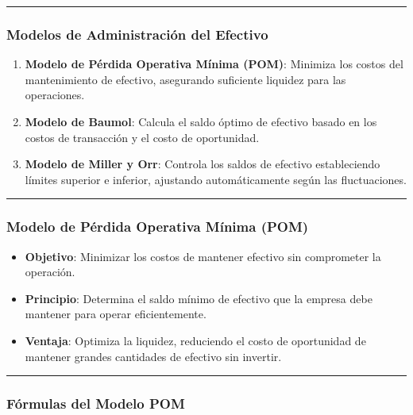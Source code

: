 \documentclass[
  letterpaper,
  DIV=11,
  numbers=noendperiod]{scrartcl}
\providecommand{\tightlist}{%
  \setlength{\itemsep}{0pt}\setlength{\parskip}{0pt}}\usepackage{longtable,booktabs,array}
\begin{document}
\begin{center}\rule{0.5\linewidth}{0.5pt}\end{center}

\subsubsection{Modelos de Administración del
Efectivo}\label{modelos-de-administraciuxf3n-del-efectivo}

\begin{enumerate}
\def\labelenumi{\arabic{enumi}.}
\tightlist
\item
  \textbf{Modelo de Pérdida Operativa Mínima (POM)}: Minimiza los costos
  del mantenimiento de efectivo, asegurando suficiente liquidez para las
  operaciones.
\item
  \textbf{Modelo de Baumol}: Calcula el saldo óptimo de efectivo basado
  en los costos de transacción y el costo de oportunidad.
\item
  \textbf{Modelo de Miller y Orr}: Controla los saldos de efectivo
  estableciendo límites superior e inferior, ajustando automáticamente
  según las fluctuaciones.
\end{enumerate}

\begin{center}\rule{0.5\linewidth}{0.5pt}\end{center}

\subsubsection{Modelo de Pérdida Operativa Mínima
(POM)}\label{modelo-de-puxe9rdida-operativa-muxednima-pom}

\begin{itemize}
\tightlist
\item
  \textbf{Objetivo}: Minimizar los costos de mantener efectivo sin
  comprometer la operación.
\item
  \textbf{Principio}: Determina el saldo mínimo de efectivo que la
  empresa debe mantener para operar eficientemente.
\item
  \textbf{Ventaja}: Optimiza la liquidez, reduciendo el costo de
  oportunidad de mantener grandes cantidades de efectivo sin invertir.
\end{itemize}

\begin{center}\rule{0.5\linewidth}{0.5pt}\end{center}

\subsubsection{Fórmulas del Modelo
POM}\label{fuxf3rmulas-del-modelo-pom}
\end{document}
